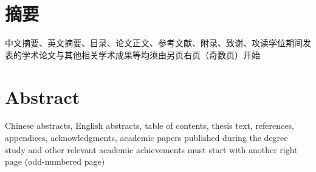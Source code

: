 \maketitle%
\MAKETITLE%
\makedeclaration%
\intobmk\chapter*{摘\quad 要}%
\setcounter{page}{1}%

中文摘要、英文摘要、目录、论文正文、参考文献、附录、致谢、攻读学位期间发表的学术论文与其他相关学术成果等均须由另页右页（奇数页）开始

\intobmk\chapter*{Abstract}%

Chinese abstracts, English abstracts, table of contents, thesis text, references, appendices, acknowledgments, academic papers published during the degree study and other relevant academic achievements must start with another right page (odd-numbered page)

